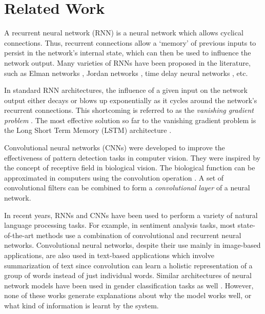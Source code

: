 \section{Related Work}

A recurrent neural network (RNN) is a neural network which allows cyclical connections. Thus, recurrent connections allow a `memory' of previous inputs to persist in the network's internal state, which can then be used to influence the network output. Many varieties of RNNs have been proposed in the literature, such as Elman networks \cite{Elman1990}, Jordan networks \cite{Jordan1990}, time delay neural networks \cite{Lang1990}, etc.

In standard RNN architectures, the influence of a given input on the network output either decays or blows up exponentially as it cycles around the network's recurrent connections. This shortcoming is referred to as the \textit{vanishing gradient problem} \cite{Bengio1994}. The most effective solution so far to the vanishing gradient problem is the Long Short Term Memory (LSTM) architecture \cite{Hochreiter1997}.

Convolutional neural networks (CNNs) were developed to improve the effectiveness of pattern detection tasks in computer vision. They were inspired by the concept of receptive field \cite{Fukushima1988} in biological vision. The biological function can be approximated in computers using the convolution operation \cite{Marr1980}. A set of convolutional filters can be combined to form a \textit{convolutional layer} of a neural network.

In recent years, RNNs and CNNs have been used to perform a variety of natural language processing tasks. For example, in sentiment analysis tasks, most state-of-the-art methods \cite{Tang2015} use a combination of convolutional and recurrent neural networks. Convolutional neural networks, despite their use mainly in image-based applications, are also used in text-based applications which involve summarization of text since convolution can learn a holistic representation of a group of words instead of just individual words. Similar architectures of neural network models have been used in gender classification tasks as well \cite{Burger2011, Mukherjee2010}. However, none of these works generate explanations about why the model works well, or what kind of information is learnt by the system.
